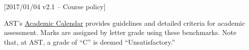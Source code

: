 [2017/01/04 v2.1 -- Course policy]

AST's \href{http://www.astheology.ns.ca/webfiles/AST_2016Calendar_web(A5)-06APR2016.pdf}{Academic
Calendar} provides guidelines and detailed criteria for academic
assessment. Marks are assigned by letter grade using these benchmarks.
Note that, at AST, a grade of ``C'' is deemed ``Unsatisfactory.''

%

